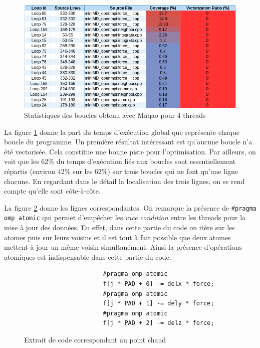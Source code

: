 \documentclass[11pt,a4paper]{article}
\begin{document}
			\begin{figure}[h!]
				\centering
				\begin{center}
					\includegraphics[width=500px]{images/maqao_loops.png}
					\caption{Statistiques des boucles obtenu avec Maqao pour 4 threads}
					\label{loop_maqao}
				\end{center}
			\end{figure}

			La figure \ref{loop_maqao} donne la part du temps d'exécution global que représente chaque boucle du programme. Un première résultat intéressant est qu'aucune boucle n'a été vectorisée. Cela constitue une bonne piste pour l'optimisation. Par ailleurs, on voit que les 62\% du temps d'exécution liés aux boucles sont essentiellement répartis (environ 42\% sur les 62\%) sur trois boucles qui ne font qu'une ligne chacune. En regardant dans le détail la localisation des trois lignes, on se rend compte qu'elle sont côte-à-côte.

			La figure \ref{code:hotspot} donne les lignes correspondantes. On remarque la présence de \verb!#pragma omp atomic! qui permet d'empêcher les \textit{race condition} entre les threads pour la mise à jour des données. En effet, dans cette partie du code on itère sur les atomes puis sur leurs voisins et il est tout à fait possible que deux atomes mettent à jour un même voisin simultanément. Ainsi la présence d'opérations atomiques est indispensable dans cette partie du code.

			\begin{figure}[h!]
				\centering
				\begin{verbatim}
					  #pragma omp atomic
					  f[j * PAD + 0] -= delx * force;
					  #pragma omp atomic
					  f[j * PAD + 1] -= dely * force;
					  #pragma omp atomic
					  f[j * PAD + 2] -= delz * force;
				\end{verbatim}
				\caption{Extrait de code correspondant au point chaud}
				\label{code:hotspot}
			\end{figure}
\end{document}
